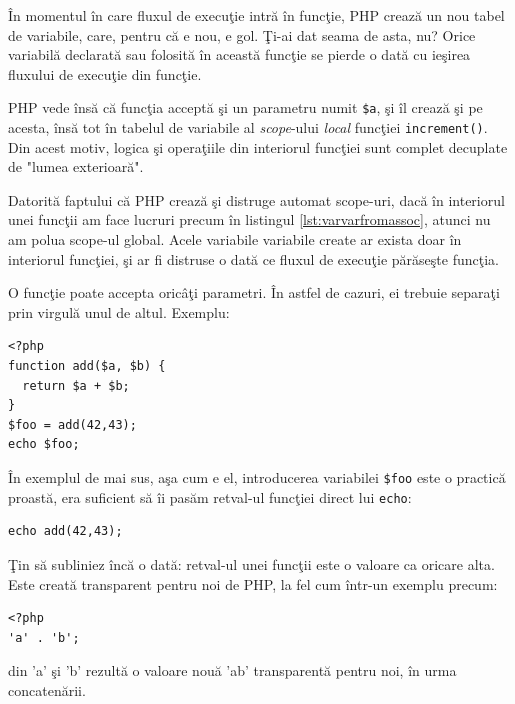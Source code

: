 În momentul în care fluxul de execuţie intră în funcţie,
PHP crează un nou tabel de variabile, care,
pentru că e nou, e gol. Ţi-ai dat seama de asta, nu?
Orice variabilă declarată sau folosită în această funcţie se pierde o dată cu ieşirea
fluxului de execuţie din funcţie.

PHP vede însă că funcţia acceptă şi un parametru numit \texttt{\$a}, şi îl crează şi pe acesta, însă
tot în tabelul de variabile al \textit{scope}-ului \textsl{local} funcţiei \texttt{increment()}.
Din acest motiv, logica şi operaţiile din interiorul funcţiei sunt complet decuplate
de "lumea exterioară".

Datorită faptului că PHP crează şi distruge automat scope-uri, dacă în interiorul
unei funcţii am face lucruri precum în listingul \ref{lst:varvarfromassoc},
atunci nu am polua scope-ul global. Acele variabile variabile create ar exista
doar în interiorul funcţiei, şi ar fi distruse o dată ce fluxul de execuţie
părăseşte funcţia.


O funcţie poate accepta oricâţi parametri. În astfel de cazuri, ei trebuie separaţi
prin virgulă unul de altul. Exemplu:
\begin{lstlisting}
<?php
function add($a, $b) {
  return $a + $b;
}
$foo = add(42,43);
echo $foo;
\end{lstlisting}



În exemplul de mai sus, aşa cum e el, introducerea variabilei \texttt{\$foo}
este o practică proastă, era suficient să îi pasăm retval-ul
funcţiei direct lui \texttt{echo}:
\begin{lstlisting}
echo add(42,43);
\end{lstlisting}

Ţin să subliniez încă o dată: retval-ul unei funcţii este o valoare
ca oricare alta. Este creată transparent pentru noi de PHP, la fel
cum într-un exemplu precum:
\begin{lstlisting}
<?php
'a' . 'b';
\end{lstlisting}
din 'a' şi 'b' rezultă o valoare nouă 'ab' transparentă pentru noi, în urma concatenării.

